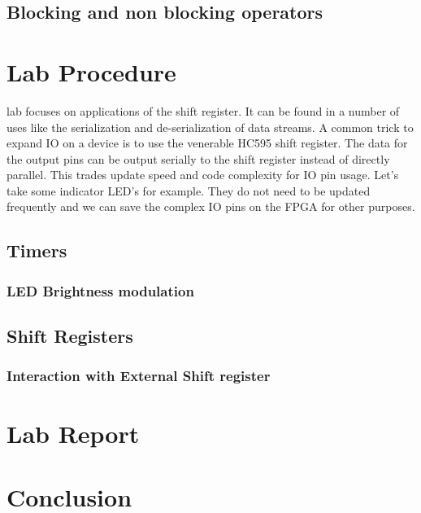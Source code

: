   \subsection{Blocking and non blocking operators}

\section{Lab Procedure}
   lab focuses on applications of the shift register. It can be found in a number of uses like the serialization and de-serialization of data streams. A common trick to expand IO on a device is to use the venerable HC595 shift register. The data for the output pins can be output serially to the shift register instead of directly parallel. This trades update speed and code complexity for IO pin usage. Let's take some indicator LED's for example. They do not need to be updated frequently and we can save the complex IO pins on the FPGA for other purposes. 

  \subsection{Timers}
    \subsubsection{LED Brightness modulation}
  
  \subsection{Shift Registers}
    \subsubsection{Interaction with External Shift register}   

\section{\bfseries  Lab Report}
  
\section{\bfseries  Conclusion}
 

%

